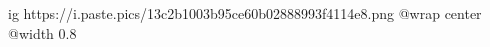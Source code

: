  
 
 
 
 

\ifcmt
  ig https://i.paste.pics/13c2b1003b95ce60b02888993f4114e8.png
  @wrap center
  @width 0.8
\fi

